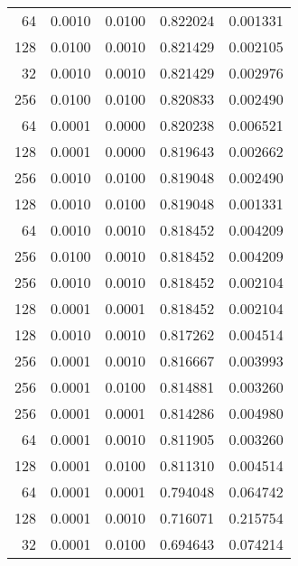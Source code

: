 \begin{tabular}{rrrrr}
  64 &  0.0010 &  0.0100 &  0.822024 &  0.001331 \\
 128 &  0.0100 &  0.0010 &  0.821429 &  0.002105 \\
  32 &  0.0010 &  0.0010 &  0.821429 &  0.002976 \\
 256 &  0.0100 &  0.0100 &  0.820833 &  0.002490 \\
  64 &  0.0001 &  0.0000 &  0.820238 &  0.006521 \\
 128 &  0.0001 &  0.0000 &  0.819643 &  0.002662 \\
 256 &  0.0010 &  0.0100 &  0.819048 &  0.002490 \\
 128 &  0.0010 &  0.0100 &  0.819048 &  0.001331 \\
  64 &  0.0010 &  0.0010 &  0.818452 &  0.004209 \\
 256 &  0.0100 &  0.0010 &  0.818452 &  0.004209 \\
 256 &  0.0010 &  0.0010 &  0.818452 &  0.002104 \\
 128 &  0.0001 &  0.0001 &  0.818452 &  0.002104 \\
 128 &  0.0010 &  0.0010 &  0.817262 &  0.004514 \\
 256 &  0.0001 &  0.0010 &  0.816667 &  0.003993 \\
 256 &  0.0001 &  0.0100 &  0.814881 &  0.003260 \\
 256 &  0.0001 &  0.0001 &  0.814286 &  0.004980 \\
  64 &  0.0001 &  0.0010 &  0.811905 &  0.003260 \\
 128 &  0.0001 &  0.0100 &  0.811310 &  0.004514 \\
  64 &  0.0001 &  0.0001 &  0.794048 &  0.064742 \\
 128 &  0.0001 &  0.0010 &  0.716071 &  0.215754 \\
  32 &  0.0001 &  0.0100 &  0.694643 &  0.074214 \\
\bottomrule
\end{tabular}
